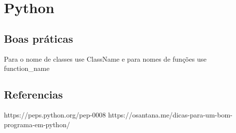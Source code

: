 \chapter{Python}
 \section{Boas práticas}

 Para o nome de classes use ClassName e para nomes de funções use function_name

\section{Referencias}
https://peps.python.org/pep-0008
https://osantana.me/dicas-para-um-bom-programa-em-python/